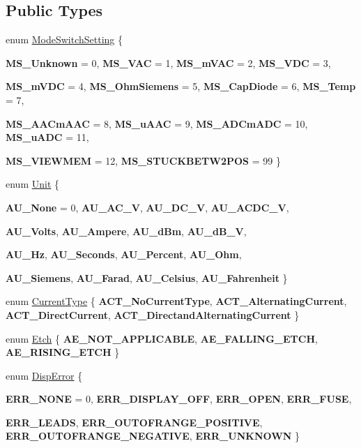 \subsection*{Public Types}
\begin{DoxyCompactItemize}
\item 
enum \hyperlink{classFluke_1_1Fluke189DataResponseAnalyzerWrapper_a2ec2700a6086ae0ebd9601fe0c0f957a}{ModeSwitchSetting} \{ \par
{\bfseries MS\_\-Unknown} = 0, 
{\bfseries MS\_\-VAC} = 1, 
{\bfseries MS\_\-mVAC} = 2, 
{\bfseries MS\_\-VDC} = 3, 
\par
{\bfseries MS\_\-mVDC} = 4, 
{\bfseries MS\_\-OhmSiemens} = 5, 
{\bfseries MS\_\-CapDiode} = 6, 
{\bfseries MS\_\-Temp} = 7, 
\par
{\bfseries MS\_\-AACmAAC} = 8, 
{\bfseries MS\_\-uAAC} = 9, 
{\bfseries MS\_\-ADCmADC} = 10, 
{\bfseries MS\_\-uADC} = 11, 
\par
{\bfseries MS\_\-VIEWMEM} = 12, 
{\bfseries MS\_\-STUCKBETW2POS} = 99
 \}
\item 
enum \hyperlink{classFluke_1_1Fluke189DataResponseAnalyzerWrapper_ab8e5f2306e4d2ad3d741d273793aaed1}{Unit} \{ \par
{\bfseries AU\_\-None} = 0, 
{\bfseries AU\_\-AC\_\-V}, 
{\bfseries AU\_\-DC\_\-V}, 
{\bfseries AU\_\-ACDC\_\-V}, 
\par
{\bfseries AU\_\-Volts}, 
{\bfseries AU\_\-Ampere}, 
{\bfseries AU\_\-dBm}, 
{\bfseries AU\_\-dB\_\-V}, 
\par
{\bfseries AU\_\-Hz}, 
{\bfseries AU\_\-Seconds}, 
{\bfseries AU\_\-Percent}, 
{\bfseries AU\_\-Ohm}, 
\par
{\bfseries AU\_\-Siemens}, 
{\bfseries AU\_\-Farad}, 
{\bfseries AU\_\-Celsius}, 
{\bfseries AU\_\-Fahrenheit}
 \}
\item 
enum \hyperlink{classFluke_1_1Fluke189DataResponseAnalyzerWrapper_afef24496da239e3613c40ad3582d7adc}{CurrentType} \{ {\bfseries ACT\_\-NoCurrentType}, 
{\bfseries ACT\_\-AlternatingCurrent}, 
{\bfseries ACT\_\-DirectCurrent}, 
{\bfseries ACT\_\-DirectandAlternatingCurrent}
 \}
\item 
enum \hyperlink{classFluke_1_1Fluke189DataResponseAnalyzerWrapper_ada71f6ab32a7b0eb40bb0ed96d7053bc}{Etch} \{ {\bfseries AE\_\-NOT\_\-APPLICABLE}, 
{\bfseries AE\_\-FALLING\_\-ETCH}, 
{\bfseries AE\_\-RISING\_\-ETCH}
 \}
\item 
enum \hyperlink{classFluke_1_1Fluke189DataResponseAnalyzerWrapper_a5e26140c615bf0b73788f665a7bec9c7}{DispError} \{ \par
{\bfseries ERR\_\-NONE} = 0, 
{\bfseries ERR\_\-DISPLAY\_\-OFF}, 
{\bfseries ERR\_\-OPEN}, 
{\bfseries ERR\_\-FUSE}, 
\par
{\bfseries ERR\_\-LEADS}, 
{\bfseries ERR\_\-OUTOFRANGE\_\-POSITIVE}, 
{\bfseries ERR\_\-OUTOFRANGE\_\-NEGATIVE}, 
{\bfseries ERR\_\-UNKNOWN}
 \}
\end{DoxyCompactItemize}
